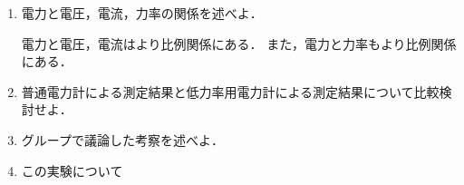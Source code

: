 \begin{enumerate}[1.)]
	\wfig{}，\wfig{}
	\item 電力と電圧，電流，力率の関係を述べよ．
	
	電力と電圧，電流はより比例関係にある．
	また，電力と力率もより比例関係にある．
	\item 普通電力計による測定結果と低力率用電力計による測定結果について比較検討せよ．
	\item グループで議論した考察を述べよ．
	\item この実験について
\end{enumerate}